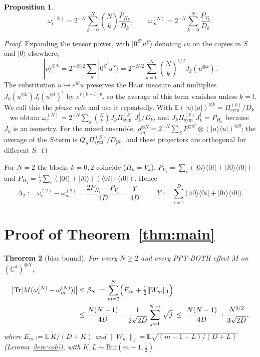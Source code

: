 \documentclass[pdflatex,sn-mathphys-num]{sn-jnl}%
\theoremstyle{thmstyleone}
\newtheorem{theorem}{Theorem}
\newtheorem{proposition}[theorem]{Proposition}
\theoremstyle{thmstylethree}
\theoremstyle{thmstyletwo}
\newcommand{\Tr}{\operatorname{Tr}}
\newcommand{\E}{\mathbb{E}}
\newcommand{\ket}[1]{|#1\rangle}
\newcommand{\bra}[1]{\langle #1|}
\newcommand{\sym}{\mathrm{sym}}
\newcommand{\C}{\mathbb{C}}
\begin{document}
\begin{proposition}\label{prop:moments}
\[
\omega_c^{(N)}=2^{-N}\sum_{k=0}^N\binom Nk\frac{P_{H_k}}{D_k},\qquad \omega_m^{(N)}=2^{-N}\sum_{k=0}^N\frac{P_{V_k}}{D_k}.
\]
\end{proposition}
\begin{proof}
Expanding the tensor power, with $\ket{0^{S^c}u^S}$ denoting $\iota u$ on the copies in $S$ and $\ket0$ elsewhere,
\begin{equation}\label{eq:expansion}
\ket v^{\otimes N}=2^{-N/2}\sum_S\ket{0^{S^c}u^S}=2^{-N/2}\sum_{k=0}^N\binom Nk^{1/2}J_k(u^{\otimes k}).
\end{equation}
The substitution $u\mapsto e^{i\theta}u$ preserves the Haar measure and multiplies $J_k(u^{\otimes
k})J_l(u^{\otimes l})^\dagger$ by $e^{i(k-l)\theta}$, so the average of this term vanishes unless $k=l$. We call this
the \emph{phase rule} and use it repeatedly. With $\E(\ket u\bra u)^{\otimes k}=\Pi^{(k)}_\sym/D_k$~\cite{harrow13}
we obtain $\omega_c^{(N)}=2^{-N}\sum_k\binom Nk J_k\Pi^{(k)}_\sym J_k^\dagger/D_k$, and $J_k\Pi^{(k)}_\sym
J_k^\dagger=P_{H_k}$ because $J_k$ is an isometry. For the mixed ensemble, $\rho_m^{\otimes N}=2^{-N}\sum_S
P^{\otimes S^c}\otimes(\ket u\bra u)^{\otimes S}$; the average of the $S$-term is $Q_S\Pi^{(S)}_\sym/D_{|S|}$, and
these projectors are orthogonal for different $S$.
\end{proof}

For $N=2$ the blocks $k=0,2$ coincide ($H_k=V_k$), $P_{V_1}=\sum_i(\ket{0i}\bra{0i}+\ket{i0}\bra{i0})$ and
$P_{H_1}=\tfrac12\sum_i(\ket{0i}+\ket{i0})(\bra{0i}+\bra{i0})$. Hence
\begin{equation}\label{eq:delta2}
\Delta_2:=\omega_c^{(2)}-\omega_m^{(2)}=\frac{2P_{H_1}-P_{V_1}}{4D}=\frac{Y}{4D},\qquad
Y:=\sum_{i=1}^D\bigl(\ket{i0}\bra{0i}+\ket{0i}\bra{i0}\bigr).
\end{equation}

\section{Proof of Theorem~\ref{thm:main}}\label{sec:proof}

\begin{theorem}[bias bound]\label{thm:bias}
For every $N\ge2$ and every PPT-BOTH effect $M$ on $(\C^d)^{\otimes N}$,
\begin{align*}
\bigl|\Tr[M(\omega_c^{(N)}-\omega_m^{(N)})]\bigr|&\le\beta_N:=\sum_{m=2}^N\Bigl(E_m+\tfrac12\|W_m\|_1\Bigr)\\
&\le\frac{N(N-1)}{4D}+\frac1{2\sqrt{2D}}\sum_{j=1}^{N-1}\sqrt j\;\le\;\frac{N(N-1)}{4D}+\frac{N^{3/2}}{3\sqrt{2D}},
\end{align*}
where $E_m:=\E\,K/(D+K)$ and $\|W_m\|_1=\E\sqrt{(m-1-L)/(D+L)}$ (Lemma~\ref{lem:coh}), with
$K,L\sim\mathrm{Bin}(m-1,\tfrac12)$.
\end{theorem}
\end{document}
